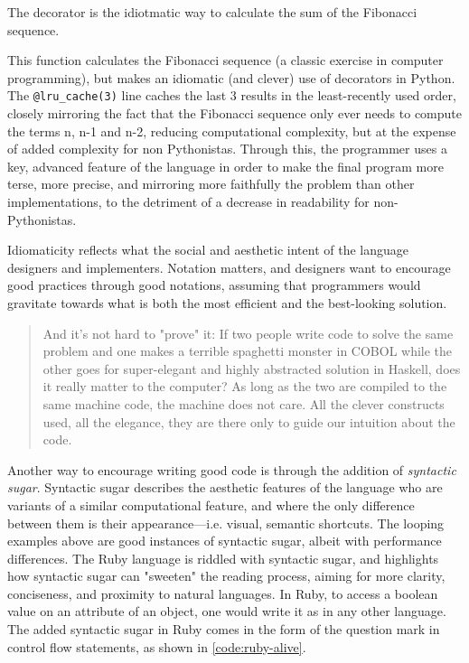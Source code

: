 \begin{listing}
  \inputminted{python}{./corpus/fibonacci.py}
  \caption{The decorator is the idiotmatic way to calculate the sum of the Fibonacci sequence. \citep{schmitz_what_2015}}
  \label{code:fibonacci}
\end{listing}

This function calculates the Fibonacci sequence (a classic exercise in computer programming), but makes an idiomatic (and clever) use of decorators in Python. The \lstinline{@lru_cache(3)} line caches the last 3 results in the least-recently used order, closely mirroring the fact that the Fibonacci sequence only ever needs to compute the terms n, n-1 and n-2, reducing computational complexity, but at the expense of added complexity for non Pythonistas. Through this, the programmer uses a key, advanced feature of the language in order to make the final program more terse, more precise, and mirroring more faithfully the problem than other implementations, to the detriment of a decrease in readability for non-Pythonistas.

Idiomaticity reflects what the social and aesthetic intent of the language designers and implementers. Notation matters, and designers want to encourage good practices through good notations, assuming that programmers would gravitate towards what is both the most efficient and the best-looking solution.

\begin{quote}
  And it's not hard to "prove" it: If two people write code to solve the same problem and one makes a terrible spaghetti monster in COBOL while the other goes for super-elegant and highly abstracted solution in Haskell, does it really matter to the computer? As long as the two are compiled to the same machine code, the machine does not care. All the clever constructs used, all the elegance, they are there only to guide our intuition about the code. \citep{sustrik_nature_2021}
\end{quote}

Another way to encourage writing good code is through the addition of \emph{syntactic sugar}. Syntactic sugar describes the aesthetic features of the language who are variants of a similar computational feature, and where the only difference between them is their appearance—i.e. visual, semantic shortcuts. The looping examples above are good instances of syntactic sugar, albeit with performance differences. The Ruby language is riddled with syntactic sugar, and highlights how syntactic sugar can "sweeten" the reading process, aiming for more clarity, conciseness, and proximity to natural languages. In Ruby, to access a boolean value on an attribute of an object, one would write it as in any other language. The added syntactic sugar in Ruby comes in the form of the question mark in control flow statements, as shown in \autoref{code:ruby-alive}.

